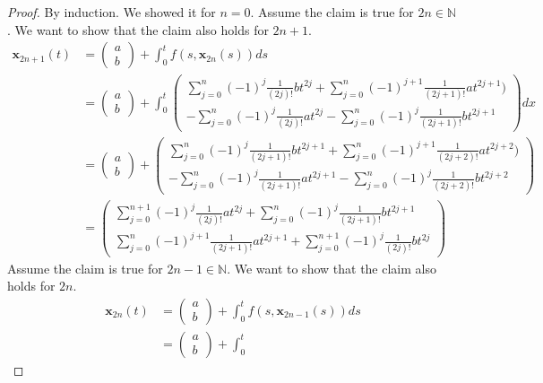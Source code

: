 \documentclass[a4paper]{article}
\begin{document}
 \begin{proof}
 By induction. We showed it for $n = 0$. Assume the claim is true for $2n \in \mathbb N$. We want to show that the claim also holds for $2n+1$.
\begin{align*}
	\mathbf x_{2n+1}(t) &= \begin{pmatrix}a\\b\end{pmatrix} + \int^t_0 f(s,\mathbf x_{2n}(s))ds \\
	&= \begin{pmatrix}
	a \\ b
\end{pmatrix}	 + \int^t_0 \begin{pmatrix}
\sum^n_{j=0} (-1)^j \frac{1}{(2j)!}bt^{2j} + \sum^n_{j=0} (-1)^{j+1} \frac{1}{(2j+1)!}at^{2j+1}) \\
-\sum^n_{j=0} (-1)^j \frac{1}{(2j)!}at^{2j} - \sum^n_{j=0} (-1)^j \frac{1}{(2j+1)!}bt^{2j+1}
 	\end{pmatrix} dx \\
 	&= \begin{pmatrix}
	a \\ b
\end{pmatrix} +
\begin{pmatrix}
	\sum^n_{j=0} (-1)^j \frac{1}{(2j+1)!}bt^{2j+1} + \sum^n_{j=0} (-1)^{j+1} \frac{1}{(2j+2)!}at^{2j+2}) \\
	-\sum^n_{j=0} (-1)^j \frac{1}{(2j+1)!}at^{2j+1} - \sum^n_{j=0} (-1)^j \frac{1}{(2j+2)!}bt^{2j+2}
\end{pmatrix} \\
	&= \begin{pmatrix}
	\sum^{n+1}_{j=0} (-1)^{j} \frac{1}{(2j)!}at^{2j} + \sum^{n}_{j=0} (-1)^j \frac{1}{(2j+1)!}bt^{2j+1} \\
	\sum^n_{j=0} (-1)^{j+1} \frac{1}{(2j+1)!}at^{2j+1} + \sum^{n+1}_{j=0} (-1)^j \frac{1}{(2j)!}bt^{2j}
	\end{pmatrix}
\end{align*}
Assume the claim is true for $2n-1 \in \mathbb N$. We want to show that the claim also holds for $2n$.
\begin{align*}
	\mathbf x_{2n}(t) &= \begin{pmatrix}a\\b\end{pmatrix} + \int^t_0 f(s,\mathbf x_{2n-1}(s))ds \\
	&= \begin{pmatrix}
	a \\ b
\end{pmatrix}	 + \int^t_0 

\end{align*}
\end{proof}
\end{document}
